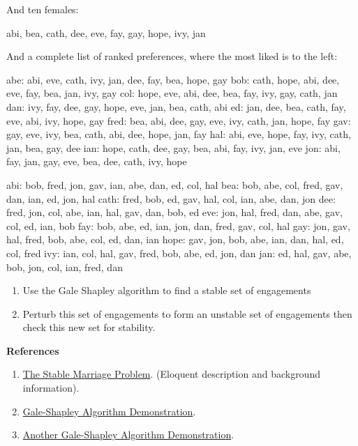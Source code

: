 And ten females:

\begin{wideverbatim}
   abi, bea, cath, dee, eve, fay, gay, hope, ivy, jan
\end{wideverbatim}

And a complete list of ranked preferences, where the most liked is to
the left:

\begin{wideverbatim}
  abe: abi, eve, cath, ivy, jan, dee, fay, bea, hope, gay
  bob: cath, hope, abi, dee, eve, fay, bea, jan, ivy, gay
  col: hope, eve, abi, dee, bea, fay, ivy, gay, cath, jan
  dan: ivy, fay, dee, gay, hope, eve, jan, bea, cath, abi
   ed: jan, dee, bea, cath, fay, eve, abi, ivy, hope, gay
 fred: bea, abi, dee, gay, eve, ivy, cath, jan, hope, fay
  gav: gay, eve, ivy, bea, cath, abi, dee, hope, jan, fay
  hal: abi, eve, hope, fay, ivy, cath, jan, bea, gay, dee
  ian: hope, cath, dee, gay, bea, abi, fay, ivy, jan, eve
  jon: abi, fay, jan, gay, eve, bea, dee, cath, ivy, hope
   
  abi: bob, fred, jon, gav, ian, abe, dan, ed, col, hal
  bea: bob, abe, col, fred, gav, dan, ian, ed, jon, hal
 cath: fred, bob, ed, gav, hal, col, ian, abe, dan, jon
  dee: fred, jon, col, abe, ian, hal, gav, dan, bob, ed
  eve: jon, hal, fred, dan, abe, gav, col, ed, ian, bob
  fay: bob, abe, ed, ian, jon, dan, fred, gav, col, hal
  gay: jon, gav, hal, fred, bob, abe, col, ed, dan, ian
 hope: gav, jon, bob, abe, ian, dan, hal, ed, col, fred
  ivy: ian, col, hal, gav, fred, bob, abe, ed, jon, dan
  jan: ed, hal, gav, abe, bob, jon, col, ian, fred, dan
\end{wideverbatim}

\begin{enumerate}
\item
  Use the Gale Shapley algorithm to find a stable set of engagements
\item
  Perturb this set of engagements to form an unstable set of engagements
  then check this new set for stability.
\end{enumerate}

\textbf{References}

\begin{enumerate}
\item
  \href{http://www.cs.columbia.edu/~evs/intro/stable/writeup.html}{The
  Stable Marriage Problem}. (Eloquent description and background
  information).
\item
  \href{http://sephlietz.com/gale-shapley/}{Gale-Shapley Algorithm
  Demonstration}.
\item
  \href{http://mathsite.math.berkeley.edu/smp/smp.html}{Another
  Gale-Shapley Algorithm Demonstration}.
\end{enumerate}

